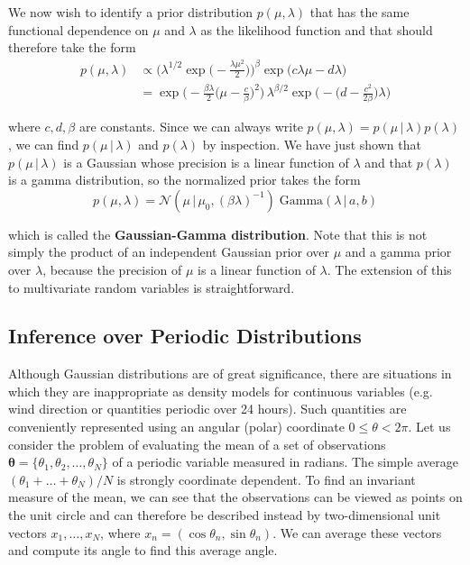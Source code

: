 \documentclass{article}
\begin{document}
    We now wish to identify a prior distribution $p(\mu, \lambda)$ that has the same functional dependence on $\mu$ and $\lambda$ as the likelihood function and that should therefore take the form
    \begin{align*}
      p(\mu, \lambda) & \propto \bigg( \lambda^{1/2} \exp \Big(-\frac{\lambda \mu^2}{2}\Big) \bigg)^\beta \exp\big( c \lambda \mu - d \lambda \big) \\
      & = \exp \bigg( -\frac{\beta \lambda}{2} \Big(\mu - \frac{c}{\beta} \Big)^2 \bigg) \, \lambda^{\beta/2} \exp \bigg(-\Big(d - \frac{c^2}{2\beta}\Big) \lambda \bigg)
    \end{align*}

    where $c, d, \beta$ are constants. Since we can always write $p(\mu, \lambda) = p(\mu\,|\,\lambda) p(\lambda)$, we can find $p(\mu\,|\,\lambda)$ and $p(\lambda)$ by inspection. We have just shown that $p(\mu \,|\, \lambda)$ is a Gaussian whose precision is a linear function of $\lambda$ and that $p(\lambda)$ is a gamma distribution, so the normalized prior takes the form
    \begin{equation}
      p(\mu, \lambda) = \mathcal{N}(\mu \,|\, \mu_0, (\beta\lambda)^{-1}) \; \text{Gamma}(\lambda\,|\,a, b)
    \end{equation}

    which is called the \textbf{Gaussian-Gamma distribution}. Note that this is not simply the product of an independent Gaussian prior over $\mu$ and a gamma prior over $\lambda$, because the precision of $\mu$ is a linear function of $\lambda$. The extension of this to multivariate random variables is straightforward.

  \subsection{Inference over Periodic Distributions}

    Although Gaussian distributions are of great significance, there are situations in which they are inappropriate as density models for continuous variables (e.g. wind direction or quantities periodic over 24 hours). Such quantities are conveniently represented using an angular (polar) coordinate $0 \leq \theta < 2\pi$. Let us consider the problem of evaluating the mean of a set of observations $\mathbf{\theta} = \{\theta_1, \theta_2, \ldots, \theta_N\}$ of a periodic variable measured in radians. The simple average $(\theta_1 + \ldots + \theta_N)/N$ is strongly coordinate dependent. To find an invariant measure of the mean, we can see that the observations can be viewed as points on the unit circle and can therefore be described instead by two-dimensional unit vectors $x_1, \ldots, x_N$, where $x_n = (\cos{\theta_n}, \sin{\theta_n})$. We can average these vectors and compute its angle to find this average angle.
\end{document}
